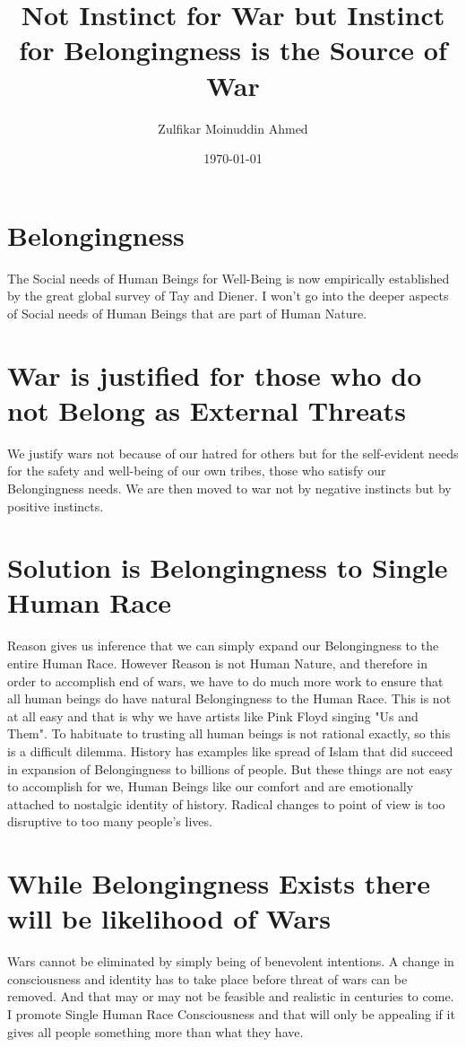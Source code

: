 \documentclass{amsart}
\title{Not Instinct for War but Instinct for Belongingness is the Source of War}
\author{Zulfikar Moinuddin Ahmed}
\date{\today}
\begin{document}
\maketitle

\section{Belongingness}
The Social needs of Human Beings for Well-Being is now empirically established by the great global survey of Tay and Diener.  I won't go into the deeper aspects of Social needs of Human Beings that are part of Human Nature.

\section{War is justified for those who do not Belong as External Threats}

We justify wars not because of our hatred for others but for the self-evident needs for the safety and well-being of our own tribes, those who satisfy our Belongingness needs.  We are then moved to war not by negative instincts but by positive instincts.

\section{Solution is Belongingness to Single Human Race}

Reason gives us inference that we can simply expand our Belongingness to the entire Human Race.  However Reason is not Human Nature, and therefore in order to accomplish end of wars, we have to do much more work to ensure that all human beings do have natural Belongingness to the Human Race.  This is not at all easy and that is why we have artists like Pink Floyd singing "Us and Them".  To habituate to trusting all human beings is not rational exactly, so this is a difficult dilemma.  History has examples like spread of Islam that did succeed in expansion of Belongingness to billions of people.  But these things are not easy to accomplish for we, Human Beings like our comfort and are emotionally attached to nostalgic identity of history.  Radical changes to point of view is too disruptive to too many people's lives.  

\section{While Belongingness Exists there will be likelihood of Wars}

Wars cannot be eliminated by simply being of benevolent intentions.  A change in consciousness and identity has to take place before threat of wars can be removed.  And that may or may not be feasible and realistic in centuries to come.  I promote Single Human Race Consciousness and that will only be appealing if it gives all people something more than what they have.  
\end{document}
